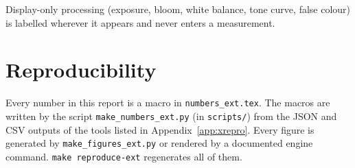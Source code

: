 Display-only processing (exposure, bloom, white balance, tone curve, false
colour) is labelled wherever it appears and never enters a measurement.

\chapter*{Reproducibility}

Every number in this report is a macro in \texttt{numbers\_ext.tex}. The
macros are written by the script \texttt{make\_numbers\_ext.py} (in
\texttt{scripts/}) from the JSON and CSV outputs of the tools listed in
Appendix~\ref{app:xrepro}. Every figure is generated by
\texttt{make\_figures\_ext.py} or rendered by a documented engine command.
\texttt{make reproduce-ext} regenerates all of them.

\cleardoublepage
{}
